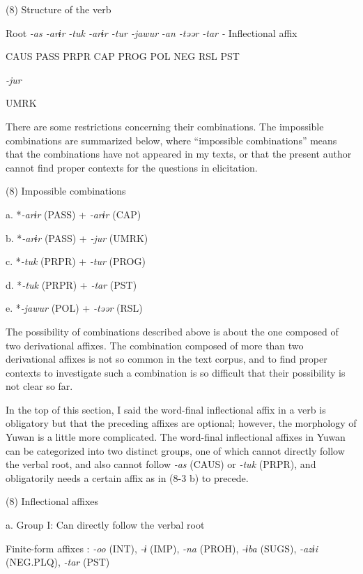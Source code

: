 (8)  Structure of the verb

  Root  \textit{{}-as  {}-arɨr} %
\textit{{}-tuk  {}-arɨr  {}-tur  {}-jawur} %
\textit{{}-an  {}-təər  {}-tar  {}-} Inflectional affix

    CAUS  PASS  PRPR  CAP  PROG  POL  NEG  RSL  PST  

          \textit{{}-jur} 

          UMRK    

There are some restrictions concerning their combinations. The impossible combinations are summarized below, where “impossible combinations” means that the combinations have not appeared in my texts, or that the present author cannot find proper contexts for the questions in elicitation.

(8)  Impossible combinations

  a.  *\textit{{}-arɨr} (PASS)   +  \textit{{}-arɨr} (CAP) 

  b.  *\textit{{}-arɨr} (PASS)   +  \textit{{}-jur} (UMRK)

  c.  *\textit{{}-tuk} (PRPR)  +  \textit{{}-tur} (PROG)

  d.  *\textit{{}-tuk} (PRPR)  +  \textit{{}-tar} (PST)

  e.  *\textit{{}-jawur} (POL)  +  \textit{{}-təər} (RSL)

The possibility of combinations described above is about the one composed of two derivational affixes. The combination composed of more than two derivational affixes is not so common in the text corpus, and to find proper contexts to investigate such a combination is so difficult that their possibility is not clear so far.

  In the top of this section, I said the word-final inflectional affix in a verb is obligatory but that the preceding affixes are optional; however, the morphology of Yuwan is a little more complicated. The word-final inflectional affixes in Yuwan can be categorized into two distinct groups, one of which cannot directly follow the verbal root, and also cannot follow \textit{{}-as} (CAUS) or \textit{{}-tuk} (PRPR), and obligatorily needs a certain affix as in (8-3 b) to precede.

(8)  Inflectional affixes

  a.  Group I: Can directly follow the verbal root

    Finite-form affixes  : \textit{{}-oo} (INT), \textit{{}-ɨ} (IMP), \textit{{}-na} (PROH), \textit{{}-ɨba} (SUGS), \textit{{}-azɨi} (NEG.PLQ), \textit{{}-tar} (PST)

